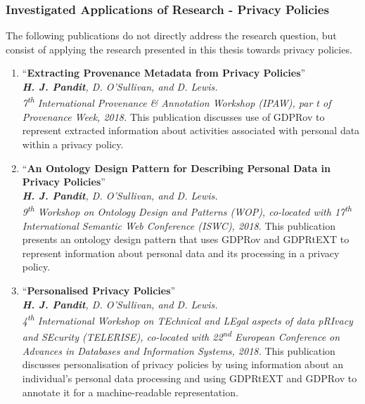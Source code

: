 \subsubsection{Investigated Applications of Research - Privacy Policies}
The following publications do not directly address the research question, but consist of applying the research presented in this thesis towards privacy policies.
\begin{enumerate}[resume]
    \item ``\textbf{Extracting Provenance Metadata from Privacy Policies}'' \cite{pandit_extracting_2018} \\
    \textit{\textbf{H. J. Pandit}, D. O’Sullivan, and D. Lewis.} \\ 
    \textit{7\textsuperscript{th} International Provenance \& Annotation Workshop (IPAW), par t of Provenance Week, 2018.}
    \vspace{0.1cm} \newline This publication discusses use of GDPRov to represent extracted information about activities associated with personal data within a privacy policy.
    \item ``\textbf{An Ontology Design Pattern for Describing Personal Data in Privacy Policies}'' \cite{pandit_ontology_2018} \\
    \textit{\textbf{H. J. Pandit}, D. O’Sullivan, and D. Lewis.} \\ 
    \textit{9\textsuperscript{th} Workshop on Ontology Design and Patterns (WOP), co-located with 17\textsuperscript{th} International Semantic Web Conference (ISWC), 2018.}
    \vspace{0.1cm} \newline This publication presents an ontology design pattern that uses GDPRov and GDPRtEXT to represent information about personal data and its processing in a privacy policy.
    \item ``\textbf{Personalised Privacy Policies}'' \cite{pandit_personalised_2018} \\
    \textit{\textbf{H. J. Pandit}, D. O’Sullivan, and D. Lewis.} \\ 
    \textit{4\textsuperscript{th} International Workshop on TEchnical and LEgal aspects of data pRIvacy and SEcurity (TELERISE), co-located with 22\textsuperscript{nd} European Conference on Advances in Databases and Information Systems, 2018.}
    \vspace{0.1cm} \newline This publication discusses personalisation of privacy policies by using information about an individual's personal data processing and using GDPRtEXT and GDPRov to annotate it for a machine-readable representation.
\end{enumerate}

